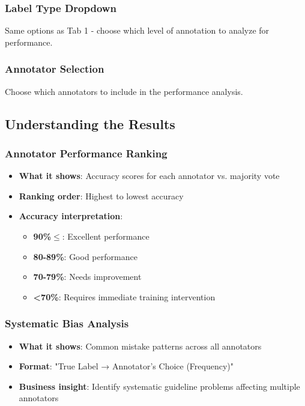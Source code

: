 \documentclass[11pt]{article}
\begin{document}
\subsubsection{Label Type Dropdown}
Same options as Tab 1 - choose which level of annotation to analyze for performance.

\subsubsection{Annotator Selection}
Choose which annotators to include in the performance analysis.

\subsection{Understanding the Results}

\subsubsection{Annotator Performance Ranking}
\begin{itemize}
\item \textbf{What it shows}: Accuracy scores for each annotator vs. majority vote
\item \textbf{Ranking order}: Highest to lowest accuracy
\item \textbf{Accuracy interpretation}:
\begin{itemize}
\item \textbf{90\%$\leq$}: Excellent performance
\item \textbf{80-89\%}: Good performance  
\item \textbf{70-79\%}: Needs improvement
\item \textbf{<70\%}: Requires immediate training intervention
\end{itemize}
\end{itemize}

\subsubsection{Systematic Bias Analysis}
\begin{itemize}
\item \textbf{What it shows}: Common mistake patterns across all annotators
\item \textbf{Format}: "True Label → Annotator's Choice (Frequency)"
\item \textbf{Business insight}: Identify systematic guideline problems affecting multiple annotators
\end{itemize}
\end{document}

